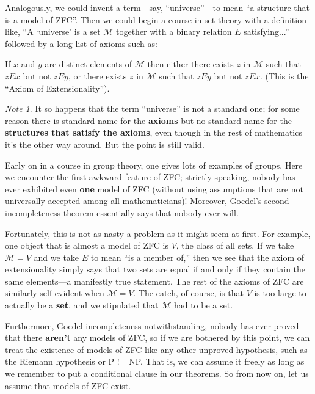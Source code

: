 \documentclass[10pt]{article}
\newcommand\axiom[1]{\textmd{#1}}
\theoremstyle{definition}
\theoremstyle{remark}
\newtheorem*{note}{Note}
\newenvironment{axiomtext}{\begin{adjustwidth}{2.5em}{0pt}}{\end{adjustwidth}}
\begin{document}
Analogously, we could invent a term---say, ``universe''---to mean ``a structure that is a model of \axiom{ZFC}''. Then we could begin a course in set theory with a definition like, ``A `universe' is a set $\mathcal M$ together with a binary relation $E$ satisfying...'' followed by a long list of axioms such as:

\begin{axiomtext}
If $x$ and $y$ are distinct elements of $\mathcal M$ then either there exists $z$ in $\mathcal M$ such that $z E x$ but not $z E y$, or there exists $z$ in $\mathcal M$ such that $z E y$ but not $z E x$. (This is the ``Axiom of Extensionality'').
\end{axiomtext}

\begin{note}
It so happens that the term ``universe'' is not a standard one; for some reason there is standard name for the \textbf{axioms} but no standard name for the \textbf{structures that satisfy the axioms}, even though in the rest of mathematics it's the other way around. But the point is still valid.
\end{note}

Early on in a course in group theory, one gives lots of examples of groups. Here we encounter the first awkward feature of \axiom{ZFC}; strictly speaking, nobody has ever exhibited even \textbf{one} model of \axiom{ZFC} (without using assumptions that are not universally accepted among all mathematicians)! Moreover, Goedel's second incompleteness theorem essentially says that nobody ever will.

Fortunately, this is not as nasty a problem as it might seem at first. For example, one object that is almost a model of \axiom{ZFC} is $V$, the class of all sets. If we take $\mathcal M = V$ and we take $E$ to mean ``is a member of,'' then we see that the axiom of extensionality simply says that two sets are equal if and only if they contain the same elements---a manifestly true statement. The rest of the axioms of \axiom{ZFC} are similarly self-evident when $\mathcal M = V$. The catch, of course, is that $V$ is too large to actually be a \textbf{set}, and we stipulated that $\mathcal M$ had to be a set.

Furthermore, Goedel incompleteness notwithstanding, nobody has ever proved that there \textbf{aren't} any models of \axiom{ZFC}, so if we are bothered by this point, we can treat the existence of models of \axiom{ZFC} like any other unproved hypothesis, such as the Riemann hypothesis or P != NP. That is, we can assume it freely as long as we remember to put a conditional clause in our theorems. So from now on, let us assume that models of \axiom{ZFC} exist.
\end{document}
